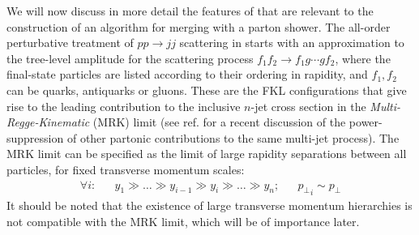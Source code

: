 We will now discuss in more detail the features of \HEJ that are
relevant to the construction of an algorithm for merging with a parton shower. The all-order
perturbative treatment of  $pp\to jj$ scattering in \HEJ starts with an
approximation to the tree-level amplitude for the scattering
process $f_1 f_2\to f_1 g\cdots gf_2$, where the final-state
particles are listed according to their ordering in rapidity, and $f_1, f_2$ can be
quarks, antiquarks or gluons. These are the FKL configurations that
give rise to the leading contribution to the inclusive $n$-jet cross section in the
\emph{Multi-Regge-Kinematic} (MRK) limit (see ref.\@ \cite{Andersen:2017kfc} for a
recent discussion of the power-suppression of other partonic contributions to
the same multi-jet process). The MRK limit can be specified as the limit of 
large rapidity separations between all particles, for fixed transverse momentum scales:
\begin{align}
 \label{eq:MRKlimt}
\forall i:&&  y_1 \gg \dots \gg y_{i-1}\gg y_i\gg \dots \gg y_n;&& {p_\perp}_i \sim p_\perp
\end{align}
It should be noted that the existence of large transverse momentum
hierarchies is not compatible with the MRK limit, which
will be of importance later.

